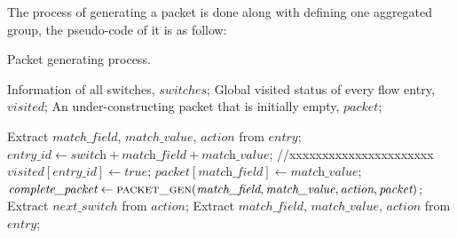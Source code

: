 The process of generating a packet is done along with defining one aggregated group, the pseudo-code of it is as follow:

\begin {tcolorbox}[blanker,float=tbp,
grow to left by=1cm, grow to right by=1cm]
\begin{algorithm}[H]

  \caption{Packet generating process.}
  
  \begin{algorithmic}[1]
    \Require
      Information of all switches, $switches$;
      Global visited status of every flow entry, $visited$;
      An under-constructing packet that is initially empty, $packet$; 

          \State Extract $match\_field$, $match\_value$, $action$ from $entry$;
          \State $entry\_id \gets \textit{switch} + \textit{match\_field} + \textit{match\_value}$;  
          \State //xxxxxxxxxxxxxxxxxxxxxx
            \State $\textit{visited}[\textit{entry\_id}] \gets true$;
            \State $packet[\textit{match\_field}] \gets \textit{match\_value}$;
            \State $\textit{complete\_packet} \gets \Call{packet\_gen}{\textit{match\_field}, \textit{match\_value}, \textit{action}, \textit{packet}}$;
          \EndIf
      \EndFor
        \EndFor
    \EndFunction
    \State
      \State Extract $next\_switch$ from $action$;
        \State Extract $match\_field$, $match\_value$, $action$ from $entry$;
  \end{algorithmic}
\end{algorithm}
\end{tcolorbox}

